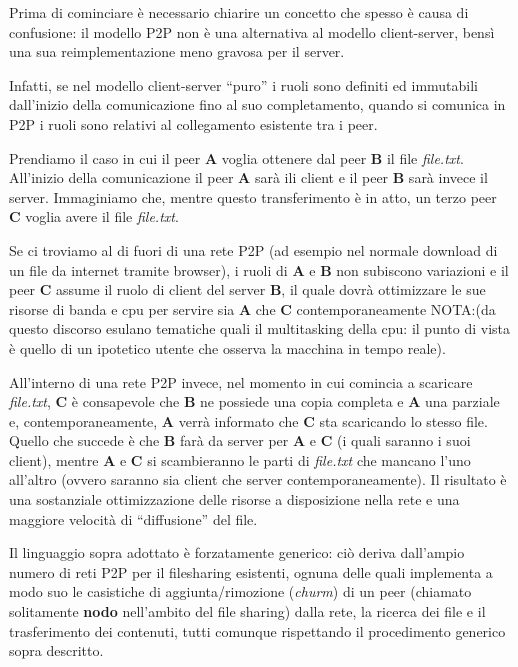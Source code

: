 Prima di cominciare è necessario chiarire un concetto che spesso è causa
di confusione: il modello P2P non è una alternativa al modello
client-server, bensì una sua reimplementazione meno gravosa per il
server.

Infatti, se nel modello client-server ``puro'' i ruoli sono definiti ed
immutabili dall'inizio della comunicazione fino al suo completamento,
quando si comunica in P2P i ruoli sono relativi al collegamento
esistente tra i peer.

Prendiamo il caso in cui il peer \textbf{A} voglia ottenere dal peer
\textbf{B} il file \emph{file.txt}. All'inizio della comunicazione il
peer \textbf{A} sarà ili client e il peer \textbf{B} sarà invece il
server. Immaginiamo che, mentre questo transferimento è in atto, un
terzo peer \textbf{C} voglia avere il file \emph{file.txt}.

Se ci troviamo al di fuori di una rete P2P (ad esempio nel normale
download di un file da internet tramite browser), i ruoli di \textbf{A}
e \textbf{B} non subiscono variazioni e il peer \textbf{C} assume il
ruolo di client del server \textbf{B}, il quale dovrà ottimizzare le sue
risorse di banda e cpu per servire sia \textbf{A} che \textbf{C}
contemporaneamente NOTA:(da questo discorso esulano tematiche quali il
multitasking della cpu: il punto di vista è quello di un ipotetico
utente che osserva la macchina in tempo reale).

All'interno di una rete P2P invece, nel momento in cui comincia a
scaricare \emph{file.txt}, \textbf{C} è consapevole che \textbf{B} ne
possiede una copia completa e \textbf{A} una parziale e,
contemporaneamente, \textbf{A} verrà informato che \textbf{C} sta
scaricando lo stesso file. Quello che succede è che \textbf{B} farà da
server per \textbf{A} e \textbf{C} (i quali saranno i suoi client),
mentre \textbf{A} e \textbf{C} si scambieranno le parti di
\emph{file.txt} che mancano l'uno all'altro (ovvero saranno sia client
che server contemporaneamente). Il risultato è una sostanziale
ottimizzazione delle risorse a disposizione nella rete e una maggiore
velocità di ``diffusione'' del file.

Il linguaggio sopra adottato è forzatamente generico: ciò deriva
dall'ampio numero di reti P2P per il filesharing esistenti, ognuna delle
quali implementa a modo suo le casistiche di aggiunta/rimozione
(\emph{churm}) di un peer (chiamato solitamente \textbf{nodo}
nell'ambito del file sharing) dalla rete, la ricerca dei file e il
trasferimento dei contenuti, tutti comunque rispettando il procedimento
generico sopra descritto.

